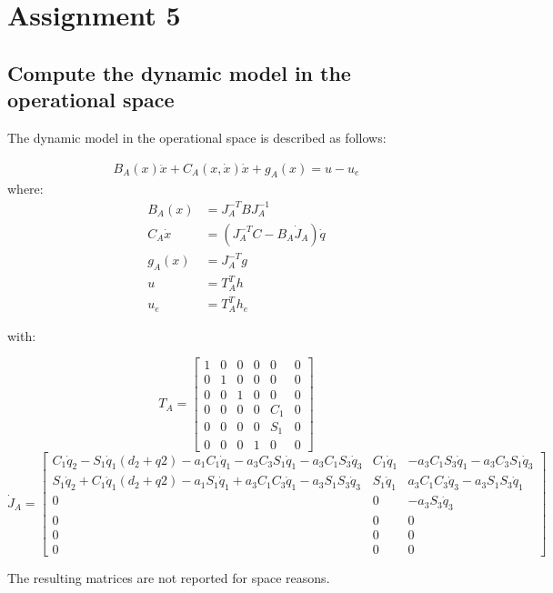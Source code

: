 \section{Assignment 5}

\subsection{Compute the dynamic model in the operational space}

The dynamic model in the operational space is described as follows:

\begin{align*}
B_A(x)\ddot x+C_A(x,\dot x)\dot x+g_A(x)=u-u_e
\end{align*}
where:
\begin{align*}
B_A(x)&=J_A^{-T}BJ_A^{-1}\\
C_A\dot x &= (J_A^{-T}C-B_A\dot J_A)\dot q\\
g_A(x)&=J_A^{-T}g\\
u &= T_A^Th\\
u_e&=T_A^Th_e
\end{align*}

with:

\begin{equation*}
T_A=\begin{bmatrix}
1&0&0&0&0&0\\
0&1&0&0&0&0\\
0&0&1&0&0&0\\
0&0&0&0&C_1&0\\
0&0&0&0&S_1&0\\
0&0&0&1&0&0
\end{bmatrix}
\end{equation*}
\begin{equation*}\dot J_A = \begin{bmatrix}
C_1\dot q_2 - S_1\dot q_1(d_2 + q2) - a_1C_1\dot q_1 - a_3C_3S_1\dot q_1 - a_3C_1S_3\dot q_3& C_1\dot q_1& - a_3C_1S_3\dot q_1 - a_3C_3S_1\dot q_3\\
S_1\dot q_2 + C_1\dot q_1(d_2 + q2) - a_1S_1\dot q_1 + a_3C_1C_3\dot q_1 - a_3S_1S_3\dot q_3& S_1\dot q_1&   a_3C_1C_3\dot q_3 - a_3S_1S_3\dot q_1\\
0&                 0&  -a_3S_3\dot q_3\\
0&0&0\\0&0&0\\0&0&0
 \end{bmatrix}
\end{equation*}

The resulting matrices are not reported for space reasons.